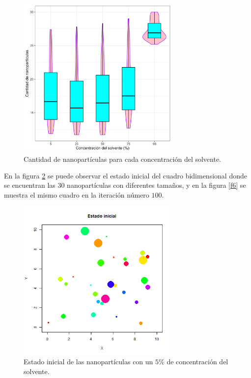 \documentclass[3p,times,twocolumn]{elsarticle}
\begin{document}
\begin{figure} [h!]%
    \centering
    \includegraphics[width=80mm]{Figura_3.png} %
    \caption{Cantidad de nanopartículas para cada concentración del solvente.}
    \label{f4}
\end{figure} 

En la figura \ref{f5} se puede observar el estado inicial del cuadro bidimensional donde se encuentran las $30$ nanopartículas con diferentes tamaños, y en la figura \ref{f6} se muestra el mismo cuadro en la iteración número $100$.

\begin{figure} [h!]%
    \centering
    \includegraphics[width=80mm]{fig_00000.png} %
    \caption{Estado inicial de las nanopartículas con un $5\%$ de concentración del solvente.}
    \label{f5}
\end{figure} 
\end{document}
